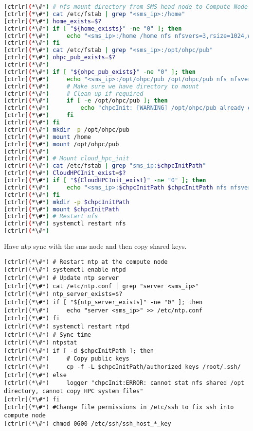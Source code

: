 \begin{lstlisting}[language=bash,keywords={}]
[ctrlr](*\#*) # nfs mount directory from SMS head node to Compute Node
[ctrlr](*\#*) cat /etc/fstab | grep "<sms_ip>:/home"
[ctrlr](*\#*) home_exists=$?
[ctrlr](*\#*) if [ "${home_exists}" -ne "0" ]; then
[ctrlr](*\#*)     echo "<sms_ip>:/home /home nfs nfsvers=3,rsize=1024,wsize=1024,cto 0 0" >> /etc/fstab
[ctrlr](*\#*) fi
[ctrlr](*\#*) cat /etc/fstab | grep "<sms_ip>:/opt/ohpc/pub"
[ctrlr](*\#*) ohpc_pub_exists=$?
[ctrlr](*\#*) 
[ctrlr](*\#*) if [ "${ohpc_pub_exists}" -ne "0" ]; then
[ctrlr](*\#*)     echo "<sms_ip>:/opt/ohpc/pub /opt/ohpc/pub nfs nfsvers=3 0 0" >> /etc/fstab
[ctrlr](*\#*)     # Make sure we have directory to mount
[ctrlr](*\#*)     # Clean up if required
[ctrlr](*\#*)     if [ -e /opt/ohpc/pub ]; then
[ctrlr](*\#*)         echo "chpcInit: [WARNING] /opt/ohpc/pub already exists!!"
[ctrlr](*\#*)     fi
[ctrlr](*\#*) fi
[ctrlr](*\#*) mkdir -p /opt/ohpc/pub
[ctrlr](*\#*) mount /home
[ctrlr](*\#*) mount /opt/ohpc/pub
[ctrlr](*\#*) 
[ctrlr](*\#*) # Mount cloud_hpc_init
[ctrlr](*\#*) cat /etc/fstab | grep "sms_ip:$chpcInitPath"
[ctrlr](*\#*) CloudHPCInit_exist=$?
[ctrlr](*\#*) if [ "${CloudHPCInit_exist}" -ne "0" ]; then
[ctrlr](*\#*)     echo "<sms_ip>:$chpcInitPath $chpcInitPath nfs nfsvers=3 0 0" >> /etc/fstab
[ctrlr](*\#*) fi
[ctrlr](*\#*) mkdir -p $chpcInitPath
[ctrlr](*\#*) mount $chpcInitPath
[ctrlr](*\#*) # Restart nfs
[ctrlr](*\#*) systemctl restart nfs
[ctrlr](*\#*) 
\end{lstlisting}

	Have ntp sync with the sms node and then copy shared keys.


\begin{lstlisting}
[ctrlr](*\#*) # Restart ntp at the compute node
[ctrlr](*\#*) systemctl enable ntpd
[ctrlr](*\#*) # Update ntp server
[ctrlr](*\#*) cat /etc/ntp.conf | grep "server <sms_ip>"
[ctrlr](*\#*) ntp_server_exists=$?
[ctrlr](*\#*) if [ "${ntp_server_exists}" -ne "0" ]; then
[ctrlr](*\#*)     echo "server <sms_ip>" >> /etc/ntp.conf
[ctrlr](*\#*) fi
[ctrlr](*\#*) systemctl restart ntpd
[ctrlr](*\#*) # Sync time
[ctrlr](*\#*) ntpstat
[ctrlr](*\#*) if [ -d $chpcInitPath ]; then
[ctrlr](*\#*)     # Copy public keys
[ctrlr](*\#*)     cp -f -L $chpcInitPath/authorized_keys /root/.ssh/
[ctrlr](*\#*) else
[ctrlr](*\#*)     logger "chpcInit:ERROR: cannot stat nfs shared /opt directory, cannot copy HPC system files"
[ctrlr](*\#*) fi
[ctrlr](*\#*) #Change file permissions in /etc/ssh to fix ssh into compute node
[ctrlr](*\#*) chmod 0600 /etc/ssh/ssh_host_*_key
\end{lstlisting}



